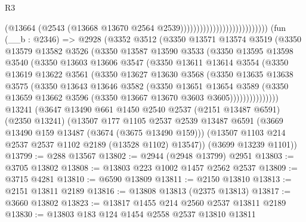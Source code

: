 \begin{lexlean}{R3}
\begin{coremodule}
                                                    (@13664
                                                      (@2543
                                                        (@13668
                                                          @13670
                                                          @2564
                                                          @2539)))))))))))))))))))))))))))
    (fun (__b : @2346) =>
    @2928
      (@3352
        @3512
        (@3350
          @13571
          @13574
          @3519
          (@3350
            @13579
            @13582
            @3526
            (@3350
              @13587
              @13590
              @3533
              (@3350
                @13595
                @13598
                @3540
                (@3350
                  @13603
                  @13606
                  @3547
                  (@3350
                    @13611
                    @13614
                    @3554
                    (@3350
                      @13619
                      @13622
                      @3561
                      (@3350
                        @13627
                        @13630
                        @3568
                        (@3350
                          @13635
                          @13638
                          @3575
                          (@3350
                            @13643
                            @13646
                            @3582
                            (@3350
                              @13651
                              @13654
                              @3589
                              (@3350
                                @13659
                                @13662
                                @3596
                                (@3350 @13667 @13670 @3603 @3605)))))))))))))))
    @13241
    (@3647
      @13490
      @661
      @1450
      @2540
      @2537
      (@2151 @13487 @6591)
      (@2350 @13241)
      (@13507
        @177
        @1105
        @2537
        @2539
        @13487
        @6591
        (@3669 @13490 @159 @13487 (@3674 (@3675 @13490 @159)))
        (@13507 @1103 @214 @2537 @2537 @1102 @2189 (@13528 @1102) @13547))
      (@3699 @13239 @1101))
@13799 := @288 @13567
@13802 := @2944 (@2948 @13799) @2951
@13803 := @3705 @13802
@13808 := @13803 @223 @1002 @1457 @2562 @2537
@13809 := @3715 @4281
@13810 := @6590 @13809
@13811 := @2150 @13810
@13813 := @2151 @13811 @2189
@13816 := @13808 @13813 (@2375 @13813)
@13817 := @3660 @13802
@13823 := @13817 @1455 @214 @2560 @2537 @13811 @2189
@13830 := @13803 @183 @124 @1454 @2558 @2537 @13810 @13811

\end{coremodule}
\end{lexlean}
